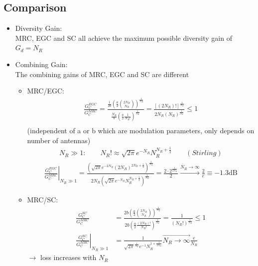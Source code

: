 \documentclass[a4paper, 10pt]{article}
\begin{document}
\subsection{Comparison}
	\begin{itemize}
		\item Diversity Gain:\\
			MRC, EGC and SC all achieve the maximum possible diversity gain of $G_d=N_R$
		\item Combining Gain:\\
			The combining gains of MRC, EGC and SC are different
			\begin{itemize}
			\item MRC/EGC:
			\begin{align*}
			\frac{G_C^{EGC}}{G_C^{MRC}}=\frac{\frac{1}{2b}\left(\frac{a}{2}\binom{2N_R}{N_R}\right)^{\frac{1}{N_R}}}{\frac{N_R}{b}\left(\frac{a}{2}\frac{1}{N_R!}\right)^{\frac{1}{N_R}}}
			=\frac{[(2N_R)!]^{\frac{1}{N_R}}}{2N_R(N_R)^{\frac{1}{N_R}}}\leq 1\\
			\end{align*}
			(independent of a or b which are modulation parameters, only depends on number of antennas)
			\begin{align*}
				N_R \gg 1: \qquad N_R!\approx \sqrt{2\pi}e^{-N_R}N_R^{N_R+\frac{1}{2}}\qquad(Stirling)
			\end{align*}
			\begin{align*}
				\left.\frac{G_C^{EGC}}{G_C^{MRC}}\right|_{N_R\gg1}
				=\frac{\left(\sqrt{2\pi}e^{-2N_R}(2N_R)^{2N_R+\frac{1}{2}}\right)^{\frac{1}{N_R}}}{2N_R\left(\sqrt{2\pi}e^{-N_R}N_R^{N_R+\frac{1}{2}}\right)^{\frac{1}{N_R}}}
				=\frac{2\cdot2^{\frac{1}{2N_R}}}{2}\overset{N_R\rightarrow\infty}{\rightarrow}\frac{2}{e}\equiv -1.3\mathrm{dB}
			\end{align*}
			\item MRC/SC:
			\begin{align*}
				\frac{G_C^{SC}}{G_C^{MRC}}
				&=\frac{2b\left(\frac{a}{2}\binom{2N_R}{N_R}\right)^{\frac{1}{N_R}}}{2b\left(\frac{a}{2}\frac{(2N_R)!}{N_R!}\right)^{\frac{1}{N_R}}}
				=\frac{1}{(N_R!)^{\frac{1}{N_R}}} \leq 1\\
				\left.\frac{G_C^{SC}}{G_C^{MRC}}\right|_{N_R\gg1}&=\frac{1}{\sqrt{2\pi}^{\frac{1}{N_R}}e^{-1}N_R^{1+\frac{1}{2N_R}}}\overset{\rightarrow}{N_R\rightarrow\infty}\frac{e}{N_R}
			\end{align*}
			$\rightarrow$ loss increases with $N_R$
			\end{itemize}
	\end{itemize}
	\newpage
\end{document}
